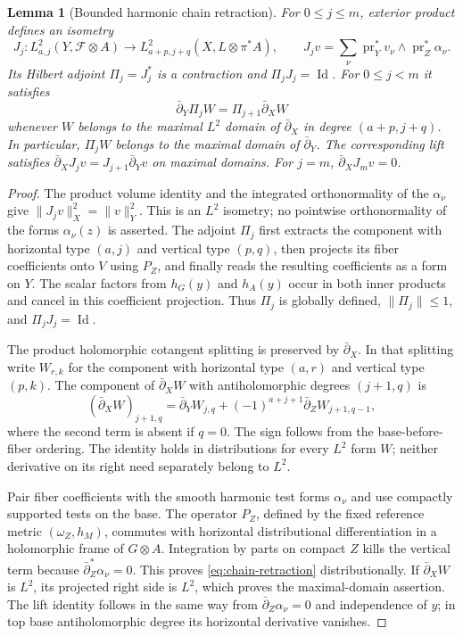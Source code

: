 \documentclass[11pt,reqno]{amsart}
\numberwithin{equation}{section}
\newtheorem{lemma}[theorem]{Lemma}
\theoremstyle{definition}
\theoremstyle{remark}
\newcommand{\db}{\bar\partial}
\newcommand{\cF}{\mathcal F}
\newcommand{\Id}{\operatorname{Id}}
\begin{document}
\begin{lemma}[Bounded harmonic chain retraction]\label{lem:chain-retraction}
For $0\leq j\leq m$, exterior product defines an isometry
\[
 J_j:L^2_{a,j}(Y,\cF\otimes A)
       \longrightarrow L^2_{a+p,j+q}(X,L\otimes\pi^*A),
 \qquad
 J_jv=\sum_\nu\operatorname{pr}_Y^*v_\nu\wedge
                         \operatorname{pr}_Z^*\alpha_\nu.
\]
Its Hilbert adjoint $\Pi_j=J_j^*$ is a contraction and
$\Pi_jJ_j=\Id$. For $0\leq j<m$ it satisfies
\begin{equation}\label{eq:chain-retraction}
 \db_Y\Pi_jW=\Pi_{j+1}\db_XW
\end{equation}
whenever $W$ belongs to the maximal $L^2$ domain of $\db_X$ in degree $(a+p,j+q)$. In particular, $\Pi_jW$ belongs to the maximal domain of $\db_Y$. The corresponding lift satisfies $\db_XJ_jv=J_{j+1}\db_Yv$ on maximal domains. For $j=m$, $\db_XJ_mv=0$.
\end{lemma}
\begin{proof}
The product volume identity and the integrated orthonormality of the $\alpha_\nu$ give $\|J_jv\|_X^2=\|v\|_Y^2$. This is an $L^2$ isometry; no pointwise orthonormality of the forms $\alpha_\nu(z)$ is asserted. The adjoint $\Pi_j$ first extracts the component with horizontal type $(a,j)$ and vertical type $(p,q)$, then projects its fiber coefficients onto $V$ using $P_Z$, and finally reads the resulting coefficients as a form on $Y$. The scalar factors from $h_G(y)$ and $h_A(y)$ occur in both inner products and cancel in this coefficient projection. Thus $\Pi_j$ is globally defined, $\|\Pi_j\|\leq1$, and $\Pi_jJ_j=\Id$.

The product holomorphic cotangent splitting is preserved by $\db_X$. In that splitting write $W_{r,k}$ for the component with horizontal type $(a,r)$ and vertical type $(p,k)$. The component of $\db_XW$ with antiholomorphic degrees $(j+1,q)$ is
\begin{equation}\label{eq:component-product}
 (\db_XW)_{j+1,q}
   =\db_YW_{j,q}+(-1)^{a+j+1}\db_ZW_{j+1,q-1},
\end{equation}
where the second term is absent if $q=0$. The sign follows from the base-before-fiber ordering. The identity holds in distributions for every $L^2$ form $W$; neither derivative on its right need separately belong to $L^2$.

Pair fiber coefficients with the smooth harmonic test forms $\alpha_\nu$ and use compactly supported tests on the base. The operator $P_Z$, defined by the fixed reference metric $(\omega_Z,h_M)$, commutes with horizontal distributional differentiation in a holomorphic frame of $G\otimes A$. Integration by parts on compact $Z$ kills the vertical term because $\db_Z^*\alpha_\nu=0$. This proves \eqref{eq:chain-retraction} distributionally. If $\db_XW$ is $L^2$, its projected right side is $L^2$, which proves the maximal-domain assertion. The lift identity follows in the same way from $\db_Z\alpha_\nu=0$ and independence of $y$; in top base antiholomorphic degree its horizontal derivative vanishes.
\end{proof}
\end{document}
